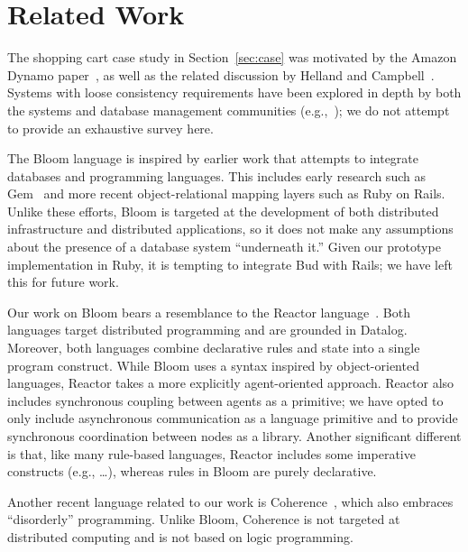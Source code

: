\section{Related Work}
\label{sec:relwork}
The shopping cart case study in Section~\ref{sec:case} was motivated by the
Amazon Dynamo paper~\cite{dynamo}, as well as the related discussion by Helland
and Campbell~\cite{quicksand}. Systems with loose consistency requirements have
been explored in depth by both the systems and database management communities
(e.g.,~\cite{sagas,leases,dangers,bayou}); we do not attempt to provide
an exhaustive survey here.

The Bloom language is inspired by earlier work that attempts to integrate
databases and programming languages.  This includes early research such as
Gem~\cite{gem} and more recent object-relational mapping layers such as Ruby on
Rails.  Unlike these efforts, Bloom is targeted at the development of both
distributed infrastructure and distributed applications, so it does not make any
assumptions about the presence of a database system ``underneath it.''  Given
our prototype implementation in Ruby, it is tempting to integrate Bud with
Rails; we have left this for future work.

Our work on Bloom bears a resemblance to the Reactor
language~\cite{reactors}. Both languages target distributed programming and are
grounded in Datalog. Moreover, both languages combine declarative rules and
state into a single program construct. While Bloom uses a syntax inspired by
object-oriented languages, Reactor takes a more explicitly agent-oriented
approach. Reactor also includes synchronous coupling between agents as a
primitive; we have opted to only include asynchronous communication as a
language primitive and to provide synchronous coordination between nodes as a
library. Another significant different is that, like many rule-based languages,
Reactor includes some imperative constructs (e.g., \ldots), whereas rules in
Bloom are purely declarative.

Another recent language related to our work is Coherence~\cite{coherence}, which
also embraces ``disorderly'' programming. Unlike Bloom, Coherence is not
targeted at distributed computing and is not based on logic programming.

